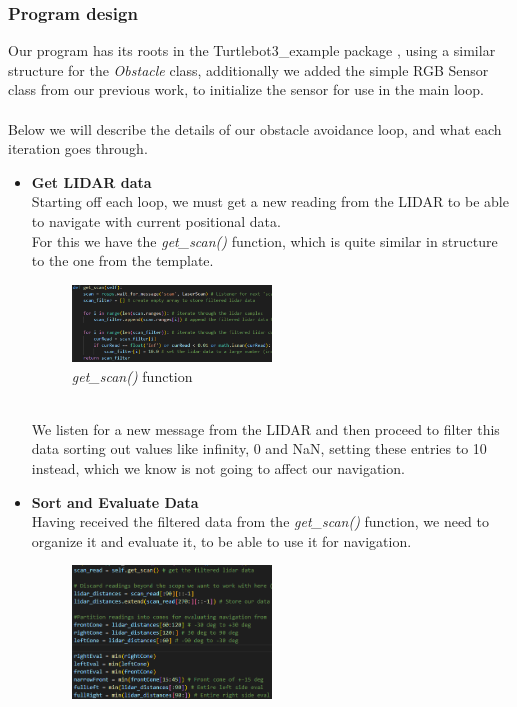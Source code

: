 \documentclass[conference]{IEEEtran}
\begin{document}
\subsubsection{Program design}
Our program has its roots in the Turtlebot3\_example package \cite{b5}, using a similar structure for the \textit{Obstacle} class,
additionally we added the simple RGB Sensor class from our previous work, to initialize the sensor for use in the main loop.
\\\\
Below we will describe the details of our obstacle avoidance loop, and what each iteration goes through.
\begin{itemize}
\item \textbf{Get LIDAR data}\\
Starting off each loop, we must get a new reading from the LIDAR to be able to navigate with current positional data.\\
For this we have the \textit{get\_scan()} function, which is quite similar in structure to the one from the template.
\begin{figure}[h] %
    \centering
    \includegraphics[width=0.5\textwidth]{get_scan.png}
    \caption{\textit{get\_scan()} function}
\end{figure} \\
We listen for a new message from the LIDAR and then proceed to filter this data sorting out 
values like infinity, 0 and NaN, setting these entries to 10 instead, which we know is not going to affect our navigation.\\
\item \textbf{Sort and Evaluate Data}\\
Having received the filtered data from the \textit{get\_scan()} function, we need to organize it and evaluate it,
to be able to use it for navigation.
\begin{figure}[h] %
    \centering
    \includegraphics[width=0.5\textwidth]{evaluateAndSort.png}

\end{figure}
\end{itemize}
\end{document}
